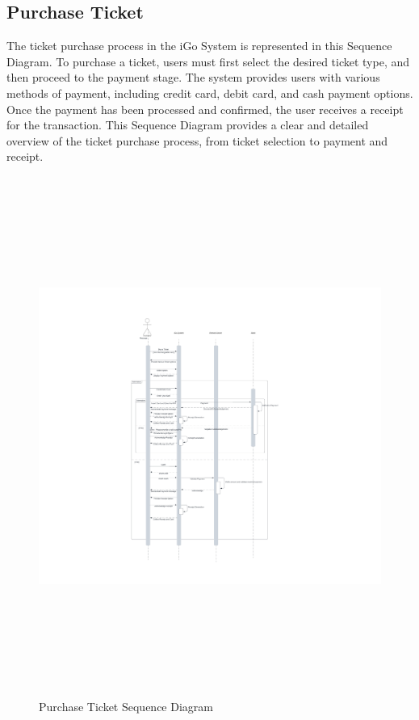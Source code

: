 \documentclass[a4paper, 11pt]{report}
\begin{document}
\subsection{Purchase Ticket}
The ticket purchase process in the iGo System is represented in this Sequence Diagram. To purchase a ticket, users must first select the desired ticket type, and then proceed to the payment stage. The system provides users with various methods of payment, including credit card, debit card, and cash payment options. Once the payment has been processed and confirmed, the user receives a receipt for the transaction. This Sequence Diagram provides a clear and detailed overview of the ticket purchase process, from ticket selection to payment and receipt. 
\begin{figure}[h]
    \renewcommand{\thefigure}{7.2.5}
    \hspace{-4cm}
    \includegraphics[width=25cm,height=17cm]{PurchaseTicket.jpeg}
    \caption{Purchase Ticket Sequence Diagram}
\end{figure}
\clearpage
\end{document}
